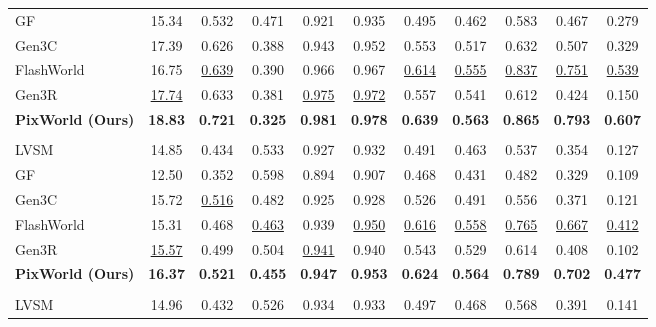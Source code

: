 \begin{table}[t]
{\begin{tabular}{l ccc cccc ccc}
GF~\citep{wu2025geometry}           & 15.34 & 0.532 & 0.471 & 0.921 & 0.935 & 0.495 & 0.462 & 0.583 & 0.467 & 0.279 \\
Gen3C~\citep{ren2025gen3c}          & 17.39 & 0.626 & 0.388 & 0.943 & 0.952 & 0.553 & 0.517 & 0.632 & 0.507 & 0.329 \\
FlashWorld~\citep{li2025flashworld} & 16.75 & \underline{0.639} & 0.390 & 0.966 & 0.967 & \underline{0.614} & \underline{0.555} & \underline{0.837} & \underline{0.751} & \underline{0.539} \\
Gen3R~\citep{huang2026gen3r}        & \underline{17.74} & 0.633 & 0.381 & \underline{0.975} & \underline{0.972} & 0.557 & 0.541 & 0.612 & 0.424 & 0.150 \\
\rowcolor{cyan!8}
\textbf{PixWorld (Ours)}           & \textbf{18.83} & \textbf{0.721} & \textbf{0.325} & \textbf{0.981} & \textbf{0.978} & \textbf{0.639} & \textbf{0.563} & \textbf{0.865} & \textbf{0.793} & \textbf{0.607} \\
\midrule
\rowcolor{gray!12}
\multicolumn{11}{l}{\textbf{DL3DV-10K}~~--~~1-view First Frame} \\
LVSM~\citep{jinlvsm}                & 14.85 & 0.434 & 0.533 & 0.927 & 0.932 & 0.491 & 0.463 & 0.537 & 0.354 & 0.127 \\
GF~\citep{wu2025geometry}           & 12.50 & 0.352 & 0.598 & 0.894 & 0.907 & 0.468 & 0.431 & 0.482 & 0.329 & 0.109 \\
Gen3C~\citep{ren2025gen3c}          & 15.72 & \underline{0.516} & 0.482 & 0.925 & 0.928 & 0.526 & 0.491 & 0.556 & 0.371 & 0.121 \\
FlashWorld~\citep{li2025flashworld} & 15.31 & 0.468 & \underline{0.463} & 0.939 & \underline{0.950} & \underline{0.616} & \underline{0.558} & \underline{0.765} & \underline{0.667} & \underline{0.412} \\
Gen3R~\citep{huang2026gen3r}        & \underline{15.57} & 0.499 & 0.504 & \underline{0.941} & 0.940 & 0.543 & 0.529 & 0.614 & 0.408 & 0.102 \\
\rowcolor{cyan!8}
\textbf{PixWorld (Ours)}           & \textbf{16.37} & \textbf{0.521} & \textbf{0.455} & \textbf{0.947} & \textbf{0.953} & \textbf{0.624} & \textbf{0.564} & \textbf{0.789} & \textbf{0.702} & \textbf{0.477} \\
\midrule
\rowcolor{gray!12}
\multicolumn{11}{l}{\textbf{DL3DV-10K}~~--~~1-view Bidirectional} \\
LVSM~\citep{jinlvsm}                & 14.96 & 0.432 & 0.526 & 0.934 & 0.933 & 0.497 & 0.468 & 0.568 & 0.391 & 0.141 \\

\end{tabular}}
\end{table}
